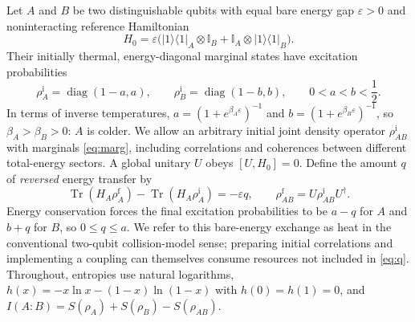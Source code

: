 \documentclass[11pt,a4paper]{article}
\newcommand{\Id}{\mathbb I}
\newcommand{\Tr}{\operatorname{Tr}}
\newcommand{\eps}{\varepsilon}
\newcommand{\rhoA}{\rho_{A}}
\newcommand{\rhoB}{\rho_{B}}
\begin{document}
Let $A$ and $B$ be two distinguishable qubits with equal bare energy gap $\eps>0$ and noninteracting reference Hamiltonian
\begin{equation}\label{eq:H}
H_0=\eps\bigl(|1\rangle\langle1|_A\otimes\Id_B+\Id_A\otimes|1\rangle\langle1|_B\bigr).
\end{equation}
Their initially thermal, energy-diagonal marginal states have excitation probabilities
\begin{equation}\label{eq:marg}
\rhoA^{\mathrm i}=\operatorname{diag}(1-a,a),\qquad
\rhoB^{\mathrm i}=\operatorname{diag}(1-b,b),\qquad 0<a<b<\frac12.
\end{equation}
In terms of inverse temperatures, $a=(1+e^{\beta_A\eps})^{-1}$ and $b=(1+e^{\beta_B\eps})^{-1}$, so $\beta_A>\beta_B>0$: $A$ is colder. We allow an arbitrary initial joint density operator $\rho_{AB}^{\mathrm i}$ with marginals \eqref{eq:marg}, including correlations and coherences between different total-energy sectors. A global unitary $U$ obeys $[U,H_0]=0$. Define the amount $q$ of \emph{reversed} energy transfer by
\begin{equation}\label{eq:q}
\Tr(H_A\rho_A^{\mathrm f})-\Tr(H_A\rho_A^{\mathrm i})=-\eps q,
\qquad \rho_{AB}^{\mathrm f}=U\rho_{AB}^{\mathrm i}U^\dagger.
\end{equation}
Energy conservation forces the final excitation probabilities to be $a-q$ for $A$ and $b+q$ for $B$, so $0\le q\le a$. We refer to this bare-energy exchange as heat in the conventional two-qubit collision-model sense; preparing initial correlations and implementing a coupling can themselves consume resources not included in \eqref{eq:q}. Throughout, entropies use natural logarithms, $h(x)=-x\ln x-(1-x)\ln(1-x)$ with $h(0)=h(1)=0$, and $I(A\!:\!B)=S(\rho_A)+S(\rho_B)-S(\rho_{AB})$.
\end{document}
